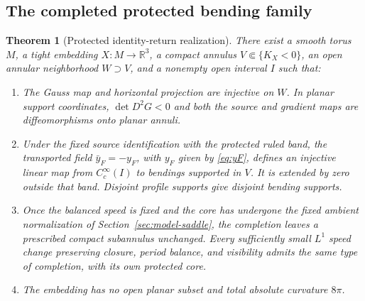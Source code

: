 \documentclass[11pt]{amsart}
\newtheorem{theorem}{Theorem}[section]
\theoremstyle{definition}
\theoremstyle{remark}
\newcommand{\R}{\mathbb R}\newcommand{\Sph}{\mathbb S}
\numberwithin{equation}{section}
\begin{document}
\subsection{The completed protected bending family}\label{sec:realization}
\begin{theorem}[Protected identity-return realization]\label{thm:protected-realization}
There exist a smooth torus $M$, a tight embedding $X:M\to\R^3$, a
compact annulus $V\Subset\{K_X<0\}$, an open annular neighborhood
$W\supset V$, and a nonempty open interval $I$ such that:
\begin{enumerate}[label=\textup{(\roman*)}]
\item The Gauss map and horizontal projection are injective on $W$.
In planar support coordinates, $\det D^2G<0$ and both the source and
gradient maps are diffeomorphisms onto planar annuli.
\item Under the fixed source identification with the protected ruled
band, the transported field $\bar y_F=-y_F$, with $y_F$ given by
\eqref{eq:yF}, defines an injective linear map from $C_c^\infty(I)$
to bendings supported in $V$. It is extended by zero outside that band.
Disjoint profile supports give disjoint bending supports.
\item Once the balanced speed is fixed and the core has undergone the
fixed ambient normalization of Section~\ref{sec:model-saddle}, the
completion leaves a prescribed compact subannulus unchanged. Every sufficiently small $L^1$
speed change preserving closure, period balance, and visibility admits
the same type of completion, with its own protected core.
\item The embedding has no open planar subset and total absolute curvature
$8\pi$.
\end{enumerate}
\end{theorem}
\end{document}
